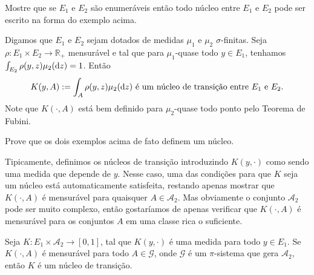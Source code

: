 \begin{exercise}
  Mostre que se $E_1$ e $E_2$ são enumeráveis então todo núcleo entre $E_1$ e $E_2$ pode ser escrito na forma do exemplo acima.
\end{exercise}

\begin{example}
  Digamos que $E_1$ e $E_2$ sejam dotados de medidas $\mu_1$ e $\mu_2$ $\sigma$-finitas.
  Seja $\rho: E_1 \times E_2 \to \mathbb{R}_+$ mensurável e tal que para $\mu_1$-quase todo $y \in E_1$, tenhamos $\int_{E_2} \rho(y, z) \mu_2(\mathop{}\!\mathrm{d} z) = 1$.
  Então
  \begin{equation}
    K(y, A) := \int_A \rho(y, z) \mu_2(\mathop{}\!\mathrm{d} z) \text{ é um núcleo de transição entre $E_1$ e $E_2$.}
  \end{equation}
  Note que $K(\cdot, A)$ está bem definido para $\mu_2$-quase todo ponto pelo Teorema de Fubini.
\end{example}

\begin{exercise}
  Prove que os dois exemplos acima de fato definem um núcleo.
\end{exercise}

Tipicamente, definimos os núcleos de transição introduzindo $K(y, \cdot)$ como sendo uma medida que depende de $y$.
Nesse caso, uma das condições para que $K$ seja um núcleo está automaticamente satisfeita, restando apenas mostrar que $K(\cdot, A)$ é mensurável para quaisquer $A \in \mathcal{A}_2$.
Mas obviamente o conjunto $\mathcal{A}_2$ pode ser muito complexo, então gostaríamos de apenas verificar que $K(\cdot, A)$ é mensurável para os conjuntos $A$ em uma classe rica o suficiente.

\begin{proposition}
  \label{p:K_nucleo_na_classe}
  Seja $K:E_1 \times \mathcal{A}_2 \to [0,1]$, tal que $K(y, \cdot)$ é uma medida para todo $y \in E_1$.
  Se $K(\cdot, A)$ é mensurável para todo $A \in \mathcal{G}$, onde $\mathcal{G}$ é um $\pi$-sistema que gera $\mathcal{A}_2$, então $K$ é um núcleo de transição.
\end{proposition}

